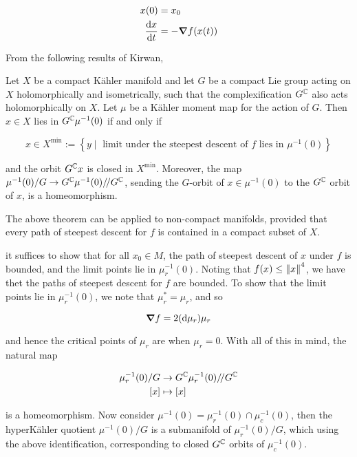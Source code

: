 \documentclass{report}
\newcommand{\sslash}{/\!/}
\begin{document}
\begin{align*}
    x(0) &= x_0 \\
    \dv{x}{t} &= -\grad f(x(t))
\end{align*}

From the following results of Kirwan,

\begin{theorem}
     Let \(X\) be a compact K\"ahler manifold and let \(G\) be a compact Lie group acting on \(X\) holomorphically and isometrically, such that the complexification \(G^{\mathbb{C}}\) also acts holomorphically on \(X\). Let \(\mu\) be a K\"ahler moment map for the action of \(G\). Then \(x \in X\) lies in \(G^{\mathbb{C}}\mu^{-1}(0)\) if and only if

    \[x \in X^{\min} := \left\{y \mid \text{ limit under the steepest descent of }f\text{ lies in }\mu^{-1}(0)\right\}\]

    and the orbit \(G^{\mathbb{C}} x\) is closed in \(X^{\min}\). Moreover, the map \(\mu^{-1}(0)/G \to G^\C\mu^{-1}(0)\sslash G^\C\), sending the \(G\)-orbit of \(x \in \mu^{-1}(0)\) to the \(G^{\mathbb{C}}\) orbit of \(x\), is a homeomorphism.
\end{theorem}

\begin{proposition}
    The above theorem can be applied to non-compact manifolds, provided that every path of steepest descent for \(f\) is contained in a compact subset of \(X\).
\end{proposition}

it suffices to show that for all \(x_0 \in M\), the path of steepest descent of \(x\) under \(f\) is bounded, and the limit points lie in \(\mu_r^{-1}(0)\). Noting that \(f(x) \le \norm{x}^4\), we have thet the paths of steepest descent for \(f\) are bounded. To show that the limit points lie in \(\mu_r^{-1}(0)\), we note that \(\mu_r^* = \mu_r\), and so 

\[\grad f = 2(\dd\mu_r)\mu_r\]

and hence the critical points of \(\mu_r\) are when \(\mu_r = 0\). With all of this in mind, the natural map

\begin{align*}
    \mu_r^{-1}(0)/G &\to G^\C\mu_r^{-1}(0)\sslash G^\C \\
    [x] &\mapsto [x]
\end{align*}

is a homeomorphism. Now consider \(\mu^{-1}(0) = \mu_r^{-1}(0) \cap \mu_c^{-1}(0)\), then the hyperK\"ahler quotient \(\mu^{-1}(0)/G\) is a submanifold of \(\mu_r^{-1}(0)/G\), which using the above identification, corresponding to closed \(G^{\mathbb{C}}\) orbits of \(\mu_c^{-1}(0)\).
\end{document}

